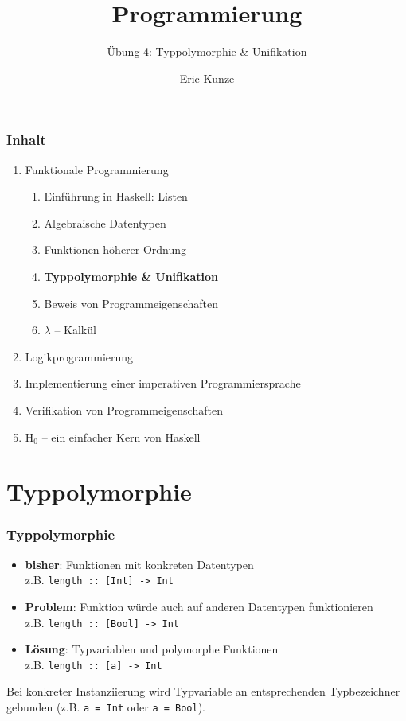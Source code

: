 \documentclass{beamer}
\begin{document}
	
	\title{Programmierung}
	\subtitle{Übung 4: Typpolymorphie \& Unifikation}
	\author{Eric Kunze}
	\date{}
	
	\maketitle
	


\begin{frame}[fragile] \frametitle{Inhalt}
	\begin{enumerate}
		\item Funktionale Programmierung
		\begin{enumerate}
			\item Einführung in Haskell: Listen
			\item Algebraische Datentypen
			\item Funktionen höherer Ordnung
			\item \textbf{Typpolymorphie \& Unifikation}
			\item Beweis von Programmeigenschaften
			\item $\lambda$ -- Kalkül
		\end{enumerate}
		\item Logikprogrammierung
		\item Implementierung einer imperativen Programmiersprache
		\item Verifikation von Programmeigenschaften
		\item H${}_\text{0}$ -- ein einfacher Kern von Haskell
	\end{enumerate}
\end{frame}

\section{Typpolymorphie}

\begin{frame}[fragile, t] \frametitle{Typpolymorphie}
	\begin{itemize}
		\item \textbf{bisher}: Funktionen mit konkreten Datentypen \\
		z.B. \texttt{length :: [Int] -> Int}
		\item \textbf{Problem}: Funktion würde auch auf anderen Datentypen funktionieren \\
		z.B. \texttt{length :: [Bool] -> Int}
		\item \textbf{Lösung}: Typvariablen und polymorphe Funktionen \\
		z.B. \texttt{length :: [a] -> Int}
	\end{itemize}

	Bei konkreter Instanziierung wird Typvariable an entsprechenden Typbezeichner gebunden (z.B. \texttt{a = Int} oder \texttt{a = Bool}).
\end{frame}
\end{document}
